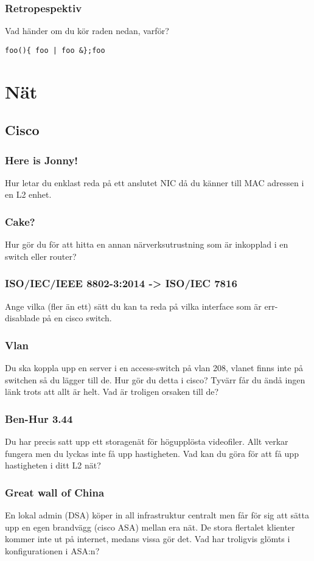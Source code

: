\documentclass[a4paper]{report}
\begin{document}
\subsubsection{Retropespektiv}
Vad händer om du kör raden nedan, varför?
\begin{verbatim}
foo(){ foo | foo &};foo
\end{verbatim}
\section{Nät}
\subsection{Cisco}
\subsubsection{Here is Jonny!}
Hur letar du enklast reda på ett anslutet NIC då du känner till MAC adressen i en L2 enhet.

\subsubsection{Cake?}
Hur gör du för att hitta en annan närverksutrustning som är inkopplad i en switch eller router?

\subsubsection{ISO/IEC/IEEE 8802-3:2014 -> ISO/IEC 7816}
Ange vilka (fler än ett) sätt du kan ta reda på vilka interface som är err-disablade på en cisco switch.

\subsubsection{Vlan}
Du ska koppla upp en server i en access-switch på vlan 208, vlanet finns inte på switchen så du lägger till de. Hur gör du detta i cisco?
Tyvärr får du ändå ingen länk trots att allt är helt. Vad är troligen orsaken till de?

\subsubsection{Ben-Hur 3.44}
Du har precis satt upp ett storagenät för högupplösta videofiler. Allt verkar fungera men du lyckas inte få upp hastigheten. Vad kan du göra för att få upp hastigheten i ditt L2 nät?

\subsubsection{Great wall of China}
En lokal admin (DSA) köper in all infrastruktur centralt men får för sig att sätta upp en egen brandvägg (cisco ASA) mellan era nät. De stora flertalet klienter kommer inte ut på internet, medans vissa gör det. Vad har troligvis glömts i konfigurationen i ASA:n? 
\end{document}
